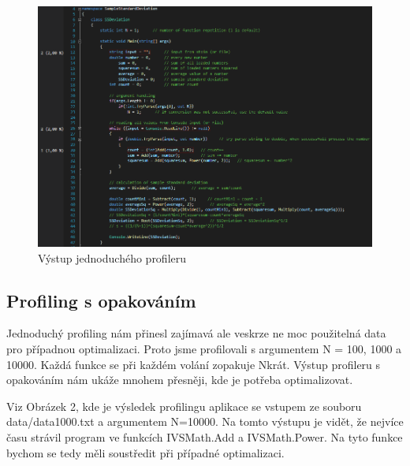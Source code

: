 \documentclass{article}
\begin{document}
\begin{figure}[h]
\centering
\includegraphics[scale=0.49]{vystup-data1000}
\caption{Výstup jednoduchého profileru}
\label{profiler:data1000}
\end{figure}

\subsection{Profiling s opakováním}
Jednoduchý profiling nám přinesl zajímavá ale veskrze ne moc použitelná data pro případnou optimalizaci. Proto jsme profilovali s argumentem N = 100, 1000 a 10000. Každá funkce se při každém volání zopakuje Nkrát. Výstup profileru s opakováním nám ukáže mnohem přesněji, kde je potřeba optimalizovat. 

Viz Obrázek 2, kde je výsledek profilingu aplikace se vstupem ze souboru data/data1000.txt a argumentem N=10000. Na tomto výstupu je vidět, že nejvíce času strávil program ve funkcích IVSMath.Add a IVSMath.Power. Na tyto funkce bychom se tedy měli soustředit při případné optimalizaci.
\end{document}
